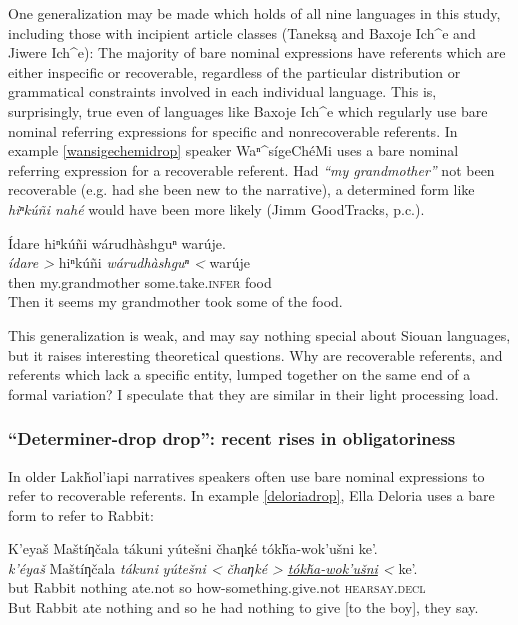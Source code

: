 \documentclass[output=paper]{LSP/langsci}
\begin{document}
One generalization may be made which holds of all nine languages in this study, including those with incipient article classes (Taneksą and Baxoje Ich\^{}e and Jiwere Ich\^{}e): The majority of bare nominal expressions have referents which are either inspecific or recoverable, regardless of the particular distribution or grammatical constraints involved in each individual language. This is, surprisingly, true even of languages like Baxoje Ich\^{}e which regularly use bare nominal referring expressions for specific and nonrecoverable referents. In example \ref{wansigechemidrop} speaker Waⁿ\^{}sígeChéMi uses a bare nominal referring expression for a recoverable referent. Had \emph{“my grandmother”} not been recoverable (e.g. had she been new to the narrative), a determined form like \emph{hiⁿkúñi nahé} would have been more likely (Jimm GoodTracks, p.c.).

\ea\label{wansigechemidrop}
Ídare hiⁿkúñi wárudhàshguⁿ warúje.\footnotemark\\
\gll	\emph{ídare >} 		hiⁿkúñi 				\emph{wárudhàshguⁿ <}	warúje\\
	then 				my.grandmother 			some.take.\textsc{infer}	food\\
\glt	Then it seems my grandmother took some of the food.
\z

This generalization is weak, and may say nothing special about Siouan languages, but it raises interesting theoretical questions. Why are recoverable referents, and referents which lack a specific entity, lumped together on the same end of a formal variation? I speculate that they are similar in their light processing load.

\subsubsection{“Determiner-drop drop”: recent rises in obligatoriness}\label{determinerdropdrop}

	In older Lakȟol’iapi narratives speakers often use bare nominal expressions to refer to recoverable referents. In example \ref{deloriadrop}, Ella Deloria uses a bare form to refer to Rabbit:
	
\ea\label{deloriadrop}
	K’eyaš Maštíƞčala tákuni yútešni čhaƞké tókȟa-wok’ušni ke’.\footnotemark\\
\gll	\emph{k’éyaš} 	Maštíƞčala 	\emph{tákuni} 	\emph{yútešni <}	 \emph{čhaƞké >} 	\emph{\underline{tókȟa-wok’ušni} <}		ke’. \\
	but 			Rabbit		nothing	 	ate.not	 	 so 			 how-something.give.not 				\textsc{hearsay.decl}\\
\glt	But Rabbit ate nothing and so he had nothing to give [to the boy], they say.
\z
\end{document}
